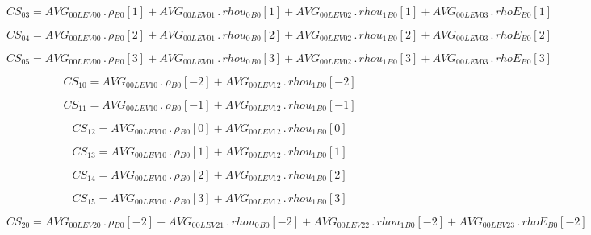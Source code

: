 \documentclass{article}
\begin{document}
\begin{dmath}CS_{03} = AVG_{0 0 LEV 00} \,.\, {\rho{_{B0}}}[{1}] + AVG_{0 0 LEV 01} \,.\, {rhou_{0}{_{B0}}}[{1}] + AVG_{0 0 LEV 02} \,.\, {rhou_{1}{_{B0}}}[{1}] + AVG_{0 0 LEV 03} \,.\, {rhoE{_{B0}}}[{1}]\end{dmath}

\begin{dmath}CS_{04} = AVG_{0 0 LEV 00} \,.\, {\rho{_{B0}}}[{2}] + AVG_{0 0 LEV 01} \,.\, {rhou_{0}{_{B0}}}[{2}] + AVG_{0 0 LEV 02} \,.\, {rhou_{1}{_{B0}}}[{2}] + AVG_{0 0 LEV 03} \,.\, {rhoE{_{B0}}}[{2}]\end{dmath}

\begin{dmath}CS_{05} = AVG_{0 0 LEV 00} \,.\, {\rho{_{B0}}}[{3}] + AVG_{0 0 LEV 01} \,.\, {rhou_{0}{_{B0}}}[{3}] + AVG_{0 0 LEV 02} \,.\, {rhou_{1}{_{B0}}}[{3}] + AVG_{0 0 LEV 03} \,.\, {rhoE{_{B0}}}[{3}]\end{dmath}

\begin{dmath}CS_{10} = AVG_{0 0 LEV 10} \,.\, {\rho{_{B0}}}[{-2}] + AVG_{0 0 LEV 12} \,.\, {rhou_{1}{_{B0}}}[{-2}]\end{dmath}

\begin{dmath}CS_{11} = AVG_{0 0 LEV 10} \,.\, {\rho{_{B0}}}[{-1}] + AVG_{0 0 LEV 12} \,.\, {rhou_{1}{_{B0}}}[{-1}]\end{dmath}

\begin{dmath}CS_{12} = AVG_{0 0 LEV 10} \,.\, {\rho{_{B0}}}[{0}] + AVG_{0 0 LEV 12} \,.\, {rhou_{1}{_{B0}}}[{0}]\end{dmath}

\begin{dmath}CS_{13} = AVG_{0 0 LEV 10} \,.\, {\rho{_{B0}}}[{1}] + AVG_{0 0 LEV 12} \,.\, {rhou_{1}{_{B0}}}[{1}]\end{dmath}

\begin{dmath}CS_{14} = AVG_{0 0 LEV 10} \,.\, {\rho{_{B0}}}[{2}] + AVG_{0 0 LEV 12} \,.\, {rhou_{1}{_{B0}}}[{2}]\end{dmath}

\begin{dmath}CS_{15} = AVG_{0 0 LEV 10} \,.\, {\rho{_{B0}}}[{3}] + AVG_{0 0 LEV 12} \,.\, {rhou_{1}{_{B0}}}[{3}]\end{dmath}

\begin{dmath}CS_{20} = AVG_{0 0 LEV 20} \,.\, {\rho{_{B0}}}[{-2}] + AVG_{0 0 LEV 21} \,.\, {rhou_{0}{_{B0}}}[{-2}] + AVG_{0 0 LEV 22} \,.\, {rhou_{1}{_{B0}}}[{-2}] + AVG_{0 0 LEV 23} \,.\, {rhoE{_{B0}}}[{-2}]\end{dmath}
\end{document}
